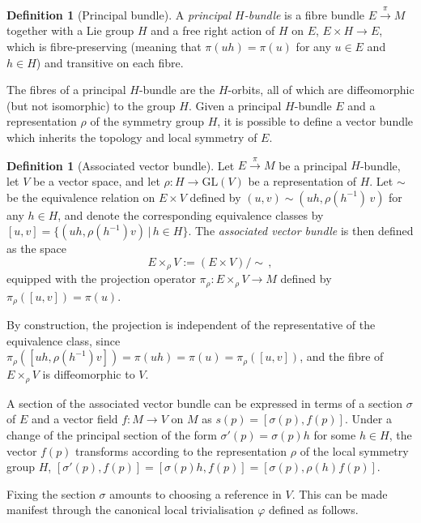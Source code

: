 \documentclass[12pt,a4paper]{article}
\numberwithin{equation}{section}
\theoremstyle{plain}
\theoremstyle{definition}
\newtheorem{definition}[theorem]{Definition}
\theoremstyle{remark}
\begin{document}
\begin{definition}[Principal bundle]\label{dfn:principal_bundle}
    A \textit{principal $H$-bundle} is a fibre bundle $E\overset{\pi}{\to}M$ together with a Lie group $H$ and a free right action of $H$ on $E$, $E\times H\to E$, which is fibre-preserving (meaning that $\pi(uh) = \pi(u)$ for any $u \in E$ and $h \in H$) and transitive on each fibre.
\end{definition}

The fibres of a principal $H$-bundle are the $H$-orbits, all of which are diffeomorphic (but not isomorphic) to the group $H$. Given a principal $H$-bundle $E$ and a representation $\rho$ of the symmetry group $H$, it is possible to define a vector bundle which inherits the topology and local symmetry of $E$.

\begin{definition}[Associated vector bundle]\label{dfn:associated_bundle}
    Let $E\overset{\pi}{\to}M$ be a principal $H$-bundle, let $V$ be a vector space, and let $\rho:H \to \mathrm{GL}(V)$ be a representation of $H$. Let $\sim$ be the equivalence relation on $E\times V$ defined by $(u,v)\sim (uh,\rho(h^{-1})\,v)$ for any $h\in H$, and denote the corresponding equivalence classes by $[u,v]=\{(uh,\rho(h^{-1})v)\,|\,h\in H\}$. The \textit{associated vector bundle} is then defined as the space
    \begin{equation}
        E \times_{\rho} V := (E\times V)/\sim\,,
    \end{equation}
    equipped with the projection operator $\pi_{\rho}: E \times_{\rho} V \to M$ defined by $\pi_{\rho}([u,v]) = \pi(u)$.
\end{definition}

By construction, the projection is independent of the representative of the equivalence class, since $\pi_{\rho}([uh,\rho(h^{-1})v]) = \pi(uh) = \pi(u) = \pi_{\rho}([u,v])$, and the fibre of $E \times_{\rho} V$ is diffeomorphic to $V$. 

A section of the associated vector bundle can be expressed in terms of a section $\sigma$ of $E$ and a vector field $f:M \to V$ on $M$ as $s(p) = \left[\sigma(p),f(p)\right]$. Under a change of the principal section of the form $\sigma'(p) = \sigma(p)h$ for some $h \in H$, the vector $f(p)$ transforms according to the representation $\rho$ of the local symmetry group $H$, $[\sigma'(p),f(p)] = [\sigma(p)h,f(p)] = [\sigma(p),\rho(h)f(p)]$.

Fixing the section $\sigma$ amounts to choosing a reference in $V$. This can be made manifest through the canonical local trivialisation $\varphi$ defined as follows.
\end{document}
